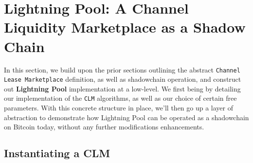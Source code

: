 \documentclass[10pt,a4paper]{article}
\theoremstyle{definition}
\begin{document}
\begin{pchstack}[boxed,center, space=1em]

 \end{pchstack}



\section{Lightning Pool: A Channel Liquidity Marketplace as a Shadow Chain}

In this section, we build upon the prior sections outlining the abstract
\texttt{Channel Lease Marketplace} definition, as well as shadowchain
operation, and construct out \textbf{Lightning Pool} implementation at a
low-level. We first being by detailing our implementation of the \texttt{CLM}
algorithms, as well as our choice of certain free parameters. With this
concrete structure in place, we'll then go up a layer of abstraction to
demonstrate how Lightning Pool can be operated as a shadowchain on Bitcoin
today, without any further modifications enhancements.

\subsection{Instantiating a CLM}
\end{document}
